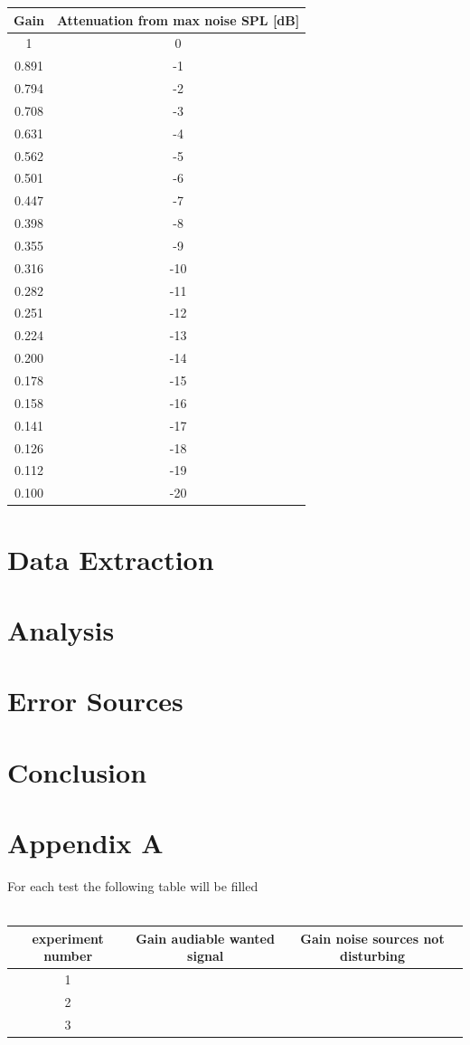 \documentclass[12pt,a4paper]{article}
\begin{document}
\begin{tabular}{c | c} \toprule 
Gain & Attenuation from max noise SPL [dB]  \\ \toprule
1 		& 0   \\
0.891 	& -1  \\
0.794	& -2  \\
0.708	& -3  \\
0.631	& -4  \\
0.562	& -5  \\
0.501	& -6  \\
0.447	& -7  \\
0.398	& -8  \\
0.355	& -9  \\
0.316	& -10 \\
0.282 	& -11  \\
0.251	& -12  \\
0.224	& -13  \\
0.200	& -14  \\
0.178	& -15  \\
0.158	& -16  \\
0.141	& -17  \\
0.126	& -18  \\
0.112	& -19  \\
0.100	& -20 \\ \bottomrule

\end{tabular}

\vspace{1cm}
\section{Data Extraction}
\vspace{1cm}
\section{Analysis}
\vspace{1cm}
\section{Error Sources}
\vspace{1cm}
\section{Conclusion}

\section*{Appendix A}
For each test the following table will be filled \\\\
\begin{tabular}{c  c  c} \toprule
experiment number & Gain audiable wanted signal & Gain noise sources not disturbing  \\ \toprule
1 &  & \\
2 &  & \\
3 &  & \\ \bottomrule
\end{tabular}
\end{document}
